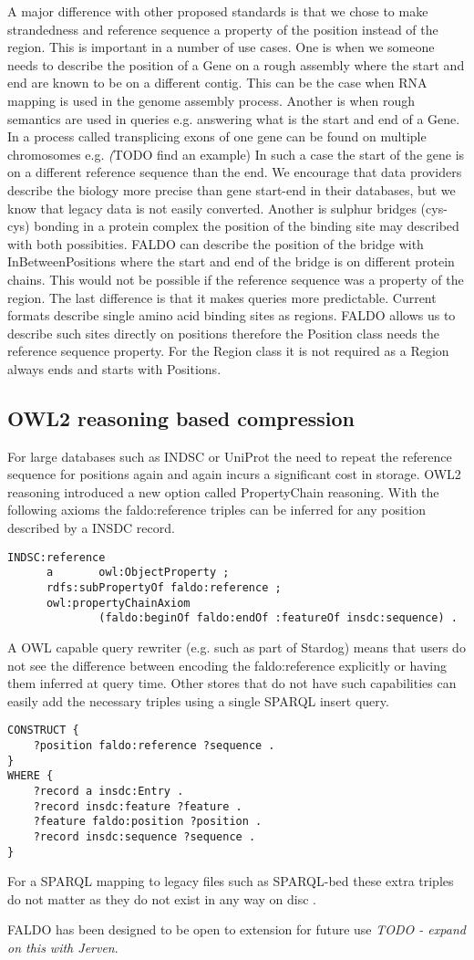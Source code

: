 A major difference with other proposed standards is that we chose to make strandedness and reference sequence a property of the position instead of the region.
This is important in a number of use cases.
One is when we someone needs to describe the position of a Gene on a rough assembly where the start and end are known to be on a different contig. 
This can be the case when RNA mapping is used in the genome assembly process.
Another is when rough semantics are used in queries e.g. answering what is the start and end of a Gene. 
In a process called transplicing exons of one gene can be found on multiple chromosomes e.g. \textit(TODO find an example)
In such a case the start of the gene is on a different reference sequence than the end.
We encourage that data providers describe the biology more precise than gene start-end in their databases, but we know that legacy data is not easily converted.
Another is sulphur bridges (cys-cys) bonding in a protein complex the position of the binding site may described with both possibities.
FALDO can describe the position of the bridge with InBetweenPositions where the start and end of the bridge is on different protein chains.
This would not be possible if the reference sequence was a property of the region. 
The last difference is that it makes queries more predictable. 
Current formats describe single amino acid binding sites as regions.
FALDO allows us to describe such sites directly on positions therefore the Position class needs the reference sequence property.
For the Region class it is not required as a Region always ends and starts with Positions.

\subsection*{OWL2 reasoning based compression}
For large databases such as INDSC or UniProt the need to repeat the reference sequence for positions again and again incurs a significant cost in storage.
OWL2 reasoning introduced a new option called PropertyChain reasoning. 
With the following axioms the faldo:reference triples can be inferred for any position described by a INSDC record.
\begin{verbatim}
INDSC:reference
      a       owl:ObjectProperty ;
      rdfs:subPropertyOf faldo:reference ;
      owl:propertyChainAxiom
              (faldo:beginOf faldo:endOf :featureOf insdc:sequence) .
\end{verbatim}
A OWL capable query rewriter (e.g. such as part of Stardog) means that users do not see the difference between encoding the faldo:reference explicitly or having them inferred at query time.
Other stores that do not have such capabilities can easily add the necessary triples using a single SPARQL insert query.
\begin{verbatim}
CONSTRUCT {
    ?position faldo:reference ?sequence .
}
WHERE {
    ?record a insdc:Entry .
    ?record insdc:feature ?feature .
    ?feature faldo:position ?position .
    ?record insdc:sequence ?sequence .
}
\end{verbatim} 
For a SPARQL mapping to legacy files such as SPARQL-bed these extra triples do not matter as they do not exist in any way on disc .


FALDO has been designed to be open to extension for future
use \textit{TODO - expand on this with Jerven}.
